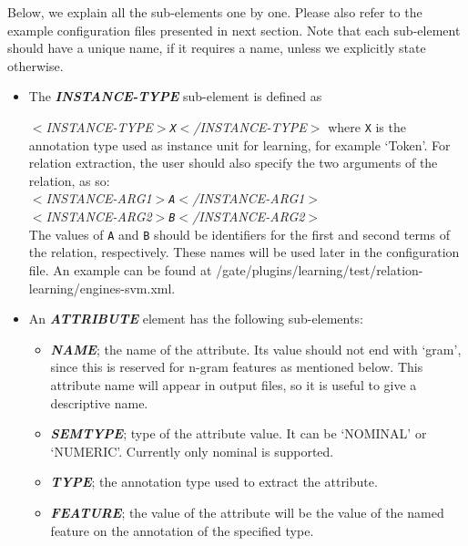 Below, we explain all the sub-elements one by one. Please also refer to the
example configuration files presented in next section.  Note that each
sub-element should have a unique name, if it requires a name, unless we
explicitly state otherwise.

\begin{itemize}
  
\item The {\em {\bf INSTANCE-TYPE}} sub-element is defined as 

{\em $<$INSTANCE-TYPE$>$\texttt{X}$<$/INSTANCE-TYPE$>$}
 where \texttt{X} is the 
annotation type used as instance unit for learning, for example `Token'. For
relation extraction, the user should also specify the two arguments of the
relation, as so:\\ {\em $<$INSTANCE-ARG1$>$\texttt{A}$<$/INSTANCE-ARG1$>$}\\
{\em $<$INSTANCE-ARG2$>$\texttt{B}$<$/INSTANCE-ARG2$>$}\\
The values of \texttt{A} 
and \texttt{B} should be identifiers for the first and second
terms of the relation, respectively. These names will be used later in the
configuration file. An example can be found at
/gate/plugins/learning/test/relation-learning/engines-svm.xml.

\item An {\em {\bf ATTRIBUTE}} element has the following sub-elements:

\begin{itemize}
  
\item {\em {\bf NAME}}; the name of the attribute. Its value should not end 
with `gram', since this is reserved for n-gram features as mentioned below.
This attribute name will appear in output files, so it is useful to give a
descriptive name.

\item {\em {\bf SEMTYPE}}; type of the attribute value. It can be `NOMINAL'
or `NUMERIC'. Currently only nominal is supported.

\item {\em {\bf TYPE}}; the annotation type used to extract the attribute.

\item {\em {\bf FEATURE}}; the value of the attribute will be the value of the
named feature on the annotation of the specified type.


\end{itemize}
\end{itemize}
